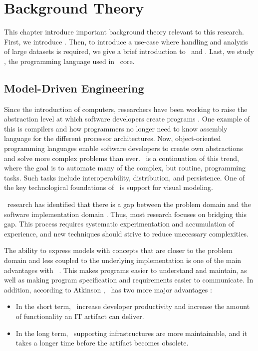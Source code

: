 \chapter{Background Theory}
\label{chap:background}
This chapter introduce important background theory relevant to this research. First, we introduce \mde. Then, to introduce a use-case where handling and analyzis of large datasets is required, we give a brief introduction to \bi~and \bd. Last, we study \delphi, the programming language used in \gap~core.

\clearpage


\section{Model-Driven Engineering}
\label{sec:Model-Driven Engineering}
Since the introduction of computers, researchers have been working to raise the abstraction level at which software developers create programs \cite{Atkinson2003-wr}. One example of this is compilers and how programmers no longer need to know assembly language for the different processor architectures. Now, object-oriented programming languages enable software developers to create own abstractions and solve more complex problems than ever. \mde~is a continuation of this trend, where the goal is to automate many of the complex, but routine, programming tasks. Such tasks include interoperability, distribution, and persistence. One of the key technological foundations of \mde~is support for visual modeling.

\mde~research has identified that there is a gap between the problem domain and the software implementation domain \cite{France2007-ae}. Thus, most research focuses on bridging this gap. This process requires systematic experimentation and accumulation of experience, and new techniques should strive to reduce unecessary complexities.

The ability to express models with concepts that are closer to the problem domain and less coupled to the underlying implementation is one of the main advantages with \mde~\cite{Selic2003-qa}. This makes programs easier to understand and maintain, as well as making program specification and requirements easier to communicate.  In addition, according to Atkinson \ea, \mde~has two more major advantages \cite{Atkinson2003-wr}:
\begin{itemize}
    \item In the short term, \mde~increase developer productivity and increase the amount of functionality an IT artifact can deliver.
    \item In the long term, \mdd~supporting infrastructures are more maintainable, and it takes a longer time before the artifact becomes obsolete.
\end{itemize}

